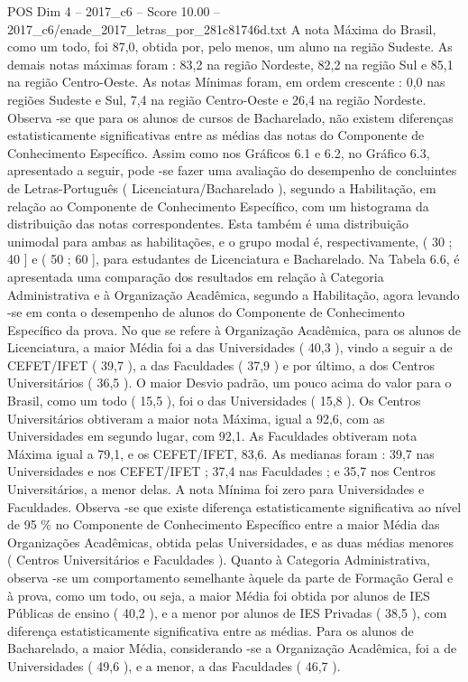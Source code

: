\begin{textsample}{POS Dim 4 – 2017\_c6 – Score 10.00 – 2017\_c6/enade\_2017\_letras\_por\_281c81746d.txt}
A nota Máxima do Brasil, como um todo, foi 87,0, obtida por, pelo menos, um aluno na região Sudeste.
As demais notas máximas foram : 83,2 na região Nordeste, 82,2 na região Sul e 85,1 na região Centro-Oeste.
As notas Mínimas foram, em ordem crescente : 0,0 nas regiões Sudeste e Sul, 7,4 na região Centro-Oeste e 26,4 na região Nordeste.
Observa -se que para os alunos de cursos de Bacharelado, não existem diferenças estatisticamente significativas entre as médias das notas do Componente de Conhecimento Específico.
Assim como nos Gráficos 6.1 e 6.2, no Gráfico 6.3, apresentado a seguir, pode -se fazer uma avaliação do desempenho de concluintes de Letras-Português ( Licenciatura/Bacharelado ), segundo a Habilitação, em relação ao Componente de Conhecimento Específico, com um histograma da distribuição das notas correspondentes.
Esta também é uma distribuição unimodal para ambas as habilitações, e o grupo modal é, respectivamente, ( 30 ; 40 ] e ( 50 ; 60 ], para estudantes de Licenciatura e Bacharelado.
Na Tabela 6.6, é apresentada uma comparação dos resultados em relação à Categoria Administrativa e à Organização Acadêmica, segundo a Habilitação, agora levando -se em conta o desempenho de alunos do Componente de Conhecimento Específico da prova.
No que se refere à Organização Acadêmica, para os alunos de Licenciatura, a maior Média foi a das Universidades ( 40,3 ), vindo a seguir a de CEFET/IFET ( 39,7 ), a das Faculdades ( 37,9 ) e por último, a dos Centros Universitários ( 36,5 ).
O maior Desvio padrão, um pouco acima do valor para o Brasil, como um todo ( 15,5 ), foi o das Universidades ( 15,8 ).
Os Centros Universitários obtiveram a maior nota Máxima, igual a 92,6, com as Universidades em segundo lugar, com 92,1.
As Faculdades obtiveram nota Máxima igual a 79,1, e os CEFET/IFET, 83,6.
As medianas foram : 39,7 nas Universidades e nos CEFET/IFET ; 37,4 nas Faculdades ; e 35,7 nos Centros Universitários, a menor delas.
A nota Mínima foi zero para Universidades e Faculdades.
Observa -se que existe diferença estatisticamente significativa ao nível de 95 \% no Componente de Conhecimento Específico entre a maior Média das Organizações Acadêmicas, obtida pelas Universidades, e as duas médias menores ( Centros Universitários e Faculdades ).
Quanto à Categoria Administrativa, observa -se um comportamento semelhante àquele da parte de Formação Geral e à prova, como um todo, ou seja, a maior Média foi obtida por alunos de IES Públicas de ensino ( 40,2 ), e a menor por alunos de IES Privadas ( 38,5 ), com diferença estatisticamente significativa entre as médias.
Para os alunos de Bacharelado, a maior Média, considerando -se a Organização Acadêmica, foi a de Universidades ( 49,6 ), e a menor, a das Faculdades ( 46,7 ).

\end{textsample}
